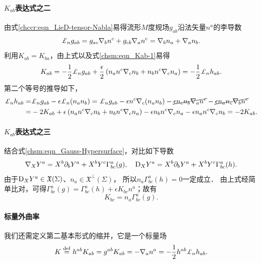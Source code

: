 \paragraph{$K_{ab}$表达式之二}
由式\eqref{chccr:eqn_LieD-tensor-Nabla}易得流形$M$度规场$g_{ab}$沿法矢量$n^a$的李导数
\begin{equation}
    \Lie_{n} g_{ab} =  g_{ac} \nabla_b n^c + g_{cb} \nabla_a n^c
      = \nabla_b n_a + \nabla_a n_b .
\end{equation}
利用$K_{ab}=K_{ba}$，由上式以及式\eqref{chsm:eqn_Kab-1}易得
\begin{equation}\label{chsm:eqn_Kab-2}
    K_{ab} = -\frac{1}{2}\Lie_{n} g_{ab} +
      \frac{\epsilon}{2}\left(n_a n^c \nabla_{c} n_b + n_b n^c \nabla_{c} n_a \right)
      =-\frac{1}{2}\Lie_{n} h_{ab}.
\end{equation}
第二个等号的推导如下，
\begin{align*}
    \Lie_{n} h_{ab} =& \Lie_{n} g_{ab} - \epsilon \Lie_{n}(n_a n_b) =
     \Lie_{n} g_{ab} -\epsilon n^c\nabla_c(n_a n_b) -\cancel{\epsilon n_c n_b \nabla_a n^c}
     -\cancel{\epsilon n_a n_c \nabla_b n^c} \\
    =& -2K_{ab}+\epsilon \left(n_a n^c \nabla_{c} n_b + n_b n^c \nabla_{c} n_a \right)
    -\epsilon n_b n^c\nabla_c n_a  -\epsilon n_a n^c\nabla_c n_b
    =-2K_{ab}.
\end{align*}

\paragraph{$K_{ab}$表达式之三}
结合式\eqref{chsm:eqn_Gauss-Hypersurface}，对比如下导数
\begin{align*}
    \nabla_{X}  Y^a  = X^b \partial_b Y^a + X^b Y^c \Gamma^a_{bc}(g), \quad
    {\rm D}_{X} Y^a  = X^b \partial_b Y^a + X^b Y^c \Gamma^a_{bc}(h) .
\end{align*}
由于${\rm D}_{X} Y^a \in \mathfrak{X}(\Sigma)$、${n}_a\in \mathfrak{X}^\bot(\Sigma)$，
所以${n}_a\Gamma_{bc}^a(h)=0$一定成立．
由上式经简单比对，可得$\Gamma^a_{bc}(g) = \Gamma^a_{bc}(h) +\epsilon K_{bc}  {n}^a$；故有
\begin{equation}\label{chsm:eqn_K-Christoffel}
    K_{bc} = {n}_a \Gamma_{bc}^a(g) .
\end{equation}


\paragraph{标量外曲率}
我们还需定义第二基本形式的缩并，它是一个标量场
\begin{equation}\label{chsm:eqn_K-scalar}
    K \overset{\mathrm {def}}{=} h^{ab} K_{ab} = g^{ab} K_{ab} =-\nabla_{a} {n}^a
    =-\frac{1}{2}h^{ab}\Lie_{n} h_{ab}.  %
\end{equation}


